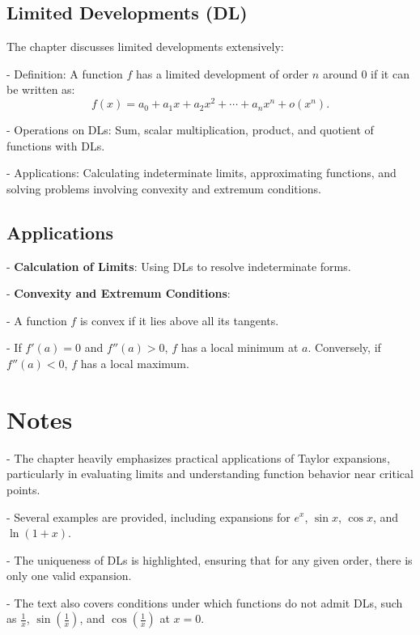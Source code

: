 \documentclass{article}
\begin{document}
\subsection*{Limited Developments (DL)}
The chapter discusses limited developments extensively:


- Definition: A function $ f $ has a limited development of order $ n $ around 0 if it can be written as:
\[
	f(x) = a_0 + a_1x + a_2x^2 + \cdots + a_nx^n + o(x^n).
\]

- Operations on DLs: Sum, scalar multiplication, product, and quotient of functions with DLs.

- Applications: Calculating indeterminate limits, approximating functions, and solving problems involving convexity and extremum conditions.


\subsection*{Applications}


- \textbf{Calculation of Limits}: Using DLs to resolve indeterminate forms.

- \textbf{Convexity and Extremum Conditions}:


- A function $ f $ is convex if it lies above all its tangents.

- If $ f'(a) = 0 $ and $ f''(a) > 0 $, $ f $ has a local minimum at $ a $. Conversely, if $ f''(a) < 0 $, $ f $ has a local maximum.



\section*{Notes}


- The chapter heavily emphasizes practical applications of Taylor expansions, particularly in evaluating limits and understanding function behavior near critical points.

- Several examples are provided, including expansions for $ e^x $, $ \sin x $, $ \cos x $, and $ \ln(1+x) $.

- The uniqueness of DLs is highlighted, ensuring that for any given order, there is only one valid expansion.

- The text also covers conditions under which functions do not admit DLs, such as $ \frac{1}{x} $, $ \sin(\frac{1}{x}) $, and $ \cos(\frac{1}{x}) $ at $ x = 0 $.
\end{document}
